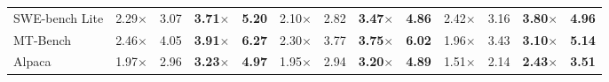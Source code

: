 \begin{table}[t]
{\begin{tabular}{l rcrc rcrc rcrc}
SWE-bench Lite & 2.29$\times$ & 3.07 & \textbf{3.71$\times$} & \textbf{5.20} & 2.10$\times$ & 2.82 & \textbf{3.47$\times$} & \textbf{4.86} & 2.42$\times$ & 3.16 & \textbf{3.80$\times$} & \textbf{4.96} \\
MT-Bench & 2.46$\times$ & 4.05 & \textbf{3.91$\times$} & \textbf{6.27} & 2.30$\times$ & 3.77 & \textbf{3.75$\times$} & \textbf{6.02} & 1.96$\times$ & 3.43 & \textbf{3.10$\times$} & \textbf{5.14} \\
Alpaca & 1.97$\times$ & 2.96 & \textbf{3.23$\times$} & \textbf{4.97} & 1.95$\times$ & 2.94 & \textbf{3.20$\times$} & \textbf{4.89} & 1.51$\times$ & 2.14 & \textbf{2.43$\times$} & \textbf{3.51} \\
\bottomrule
\end{tabular}
}
\end{table}

